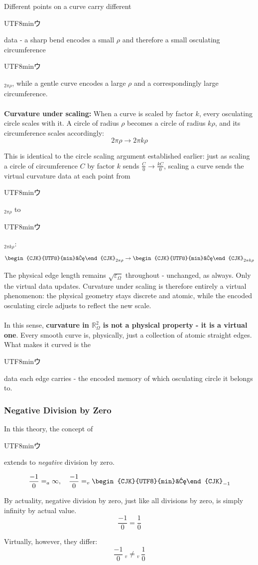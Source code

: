 \documentclass{article}
\newcommand{\U}{\begin{CJK}{UTF8}{min}ウ\end{CJK}}
\begin{document}
Different points on a curve carry different \U{} data - a sharp bend encodes 
a small $\rho$ and therefore a small osculating circumference \U$_{2\pi\rho}$, 
while a gentle curve encodes a large $\rho$ and a correspondingly large 
circumference.\\\\
\textbf{Curvature under scaling:} When a curve is scaled by factor $k$, 
every osculating circle scales with it. A circle of radius $\rho$ becomes 
a circle of radius $k\rho$, and its circumference scales accordingly:
$$2\pi\rho \to 2\pi k\rho$$

This is identical to the circle scaling argument established earlier: just 
as scaling a circle of circumference $C$ by factor $k$ sends 
$\frac{C}{0} \to \frac{kC}{0}$, scaling a curve sends the virtual curvature 
data at each point from \U$_{2\pi\rho}$ to \U$_{2\pi k\rho}$:
$$\text{\U}_{2\pi\rho} \to \text{\U}_{2\pi k\rho}$$

The physical edge length remains $\sqrt{\varepsilon_\Omega}$ throughout - 
unchanged, as always. Only the virtual data updates. Curvature under scaling 
is therefore entirely a virtual phenomenon: the physical geometry stays 
discrete and atomic, while the encoded osculating circle adjusts to reflect 
the new scale.\\\\
In this sense, \textbf{curvature in $\mathbb{R}_\Omega^2$ is not a physical 
property - it is a virtual one}. Every smooth curve is, physically, just a 
collection of atomic straight edges. What makes it curved is the \U{} data 
each edge carries - the encoded memory of which osculating circle it belongs 
to.

\subsubsection{Negative Division by Zero}

In this theory, the concept of \U{} extends to \textit{negative} division by zero. 

$$\frac{-1}{0} =_a \infty, \quad \frac{-1}{0} =_v \text{\U}_{-1}$$

By actuality, negative division by zero, just like all divisions by zero, is simply infinity by actual value.
$$\frac{-1}{0} = \frac{1}{0}$$

Virtually, however, they differ:
$$\frac{-1}{0} \ _v{}{\neq}{}_v \ \frac{1}{0}$$
\end{document}
